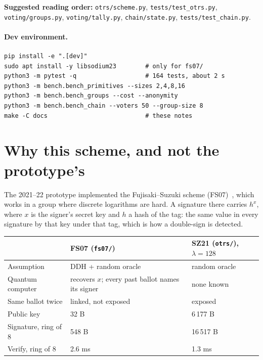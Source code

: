 \documentclass[11pt,a4paper]{article}
\newcommand{\file}[1]{\texttt{#1}}
\theoremstyle{definition}
\begin{document}
\noindent
\textbf{Suggested reading order:} \file{otrs/scheme.py},
\file{tests/test\_otrs.py}, \file{voting/groups.py},
\file{voting/tally.py}, \file{chain/state.py}, \file{tests/test\_chain.py}.

\paragraph{Dev environment.}
\begin{lstlisting}[style=shell]
pip install -e ".[dev]"
sudo apt install -y libsodium23        # only for fs07/
python3 -m pytest -q                   # 164 tests, about 2 s
python3 -m bench.bench_primitives --sizes 2,4,8,16
python3 -m bench.bench_groups --cost --anonymity
python3 -m bench.bench_chain --voters 50 --group-size 8
make -C docs                           # these notes
\end{lstlisting}

\section{Why this scheme, and not the prototype's}
\label{sec:fs07}

The 2021--22 prototype implemented the Fujisaki--Suzuki scheme
(FS07)~\cite{FS07}, which works in a group where discrete logarithms are
hard. A signature there carries $h^{x}$, where $x$ is the signer's secret
key and $h$ a hash of the tag: the same value in every signature by that
key under that tag, which is how a double-sign is detected.

\begin{center}
\small
\begin{tabular}{lll}
\toprule
& FS07 (\file{fs07/}) & SZ21 (\file{otrs/}), $\lambda = 128$ \\
\midrule
Assumption & DDH + random oracle & random oracle \\
Quantum computer & recovers $x$; every past ballot names its signer & none known \\
Same ballot twice & linked, not exposed & exposed \\
Public key & 32 B & 6\,177 B \\
Signature, ring of 8 & 548 B & 16\,517 B \\
Verify, ring of 8 & 2.6 ms & 1.3 ms \\
\bottomrule
\end{tabular}
\end{center}
\end{document}
